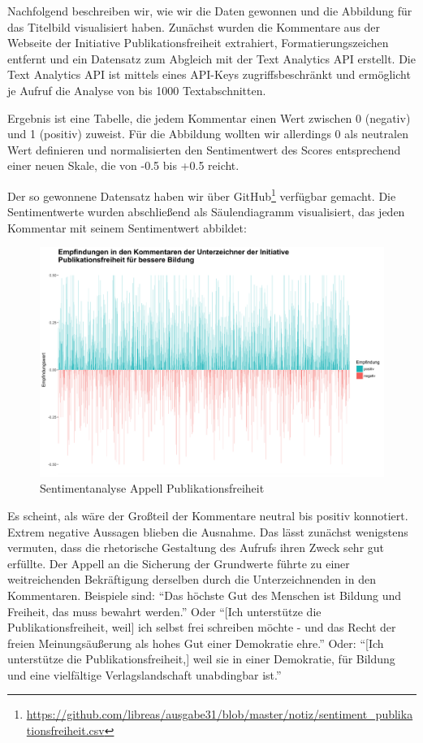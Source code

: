 \documentclass[a4paper,
fontsize=11pt,
oneside,
numbers=noperiodatend,
parskip=half-,
bibliography=totoc,
final
]{scrartcl}
\begin{document}
Nachfolgend beschreiben wir, wie wir die Daten gewonnen und die
Abbildung für das Titelbild visualisiert haben. Zunächst wurden die
Kommentare aus der Webseite der Initiative Publikationsfreiheit
extrahiert, Formatierungszeichen entfernt und ein Datensatz zum Abgleich
mit der Text Analytics API erstellt. Die Text Analytics API ist mittels
eines API-Keys zugriffsbeschränkt und ermöglicht je Aufruf die Analyse
von bis 1000 Textabschnitten.

Ergebnis ist eine Tabelle, die jedem Kommentar einen Wert zwischen 0
(negativ) und 1 (positiv) zuweist. Für die Abbildung wollten wir
allerdings 0 als neutralen Wert definieren und normalisierten den
Sentimentwert des Scores entsprechend einer neuen Skale, die von -0.5
bis +0.5 reicht.

Der so gewonnene Datensatz haben wir über GitHub\footnote{\url{https://github.com/libreas/ausgabe31/blob/master/notiz/sentiment_publikationsfreiheit.csv}}
verfügbar gemacht. Die Sentimentwerte wurden abschließend als
Säulendiagramm visualisiert, das jeden Kommentar mit seinem
Sentimentwert abbildet:

\begin{figure}
\centering
\includegraphics{img/sentiment_abbbildung.png}
\caption{Sentimentanalyse Appell Publikationsfreiheit}
\end{figure}

Es scheint, als wäre der Großteil der Kommentare neutral bis positiv
konnotiert. Extrem negative Aussagen blieben die Ausnahme. Das lässt
zunächst wenigstens vermuten, dass die rhetorische Gestaltung des
Aufrufs ihren Zweck sehr gut erfüllte. Der Appell an die Sicherung der
Grundwerte führte zu einer weitreichenden Bekräftigung derselben durch
die Unterzeichnenden in den Kommentaren. Beispiele sind: \enquote{Das
höchste Gut des Menschen ist Bildung und Freiheit, das muss bewahrt
werden.} Oder \enquote{{[}Ich unterstütze die Publikationsfreiheit,
weil{]} ich selbst frei schreiben möchte - und das Recht der freien
Meinungsäußerung als hohes Gut einer Demokratie ehre.} Oder:
\enquote{{[}Ich unterstütze die Publikationsfreiheit,{]} weil sie in
einer Demokratie, für Bildung und eine vielfältige Verlagslandschaft
unabdingbar ist.}
\end{document}
